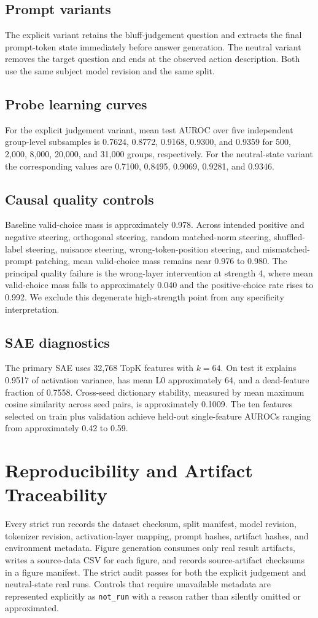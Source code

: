 \subsection{Prompt variants}
The explicit variant retains the bluff-judgement question and extracts the final prompt-token state immediately before answer generation. The neutral variant removes the target question and ends at the observed action description. Both use the same subject model revision and the same split.

\subsection{Probe learning curves}
For the explicit judgement variant, mean test AUROC over five independent group-level subsamples is 0.7624, 0.8772, 0.9168, 0.9300, and 0.9359 for 500, 2,000, 8,000, 20,000, and 31,000 groups, respectively. For the neutral-state variant the corresponding values are 0.7100, 0.8495, 0.9069, 0.9281, and 0.9346.

\subsection{Causal quality controls}
Baseline valid-choice mass is approximately 0.978. Across intended positive and negative steering, orthogonal steering, random matched-norm steering, shuffled-label steering, nuisance steering, wrong-token-position steering, and mismatched-prompt patching, mean valid-choice mass remains near 0.976 to 0.980. The principal quality failure is the wrong-layer intervention at strength 4, where mean valid-choice mass falls to approximately 0.040 and the positive-choice rate rises to 0.992. We exclude this degenerate high-strength point from any specificity interpretation.

\subsection{SAE diagnostics}
The primary SAE uses 32,768 TopK features with $k=64$. On test it explains 0.9517 of activation variance, has mean L0 approximately 64, and a dead-feature fraction of 0.7558. Cross-seed dictionary stability, measured by mean maximum cosine similarity across seed pairs, is approximately 0.1009. The ten features selected on train plus validation achieve held-out single-feature AUROCs ranging from approximately 0.42 to 0.59.

\section{Reproducibility and Artifact Traceability}
Every strict run records the dataset checksum, split manifest, model revision, tokenizer revision, activation-layer mapping, prompt hashes, artifact hashes, and environment metadata. Figure generation consumes only real result artifacts, writes a source-data CSV for each figure, and records source-artifact checksums in a figure manifest. The strict audit passes for both the explicit judgement and neutral-state real runs. Controls that require unavailable metadata are represented explicitly as \texttt{not\_run} with a reason rather than silently omitted or approximated.

